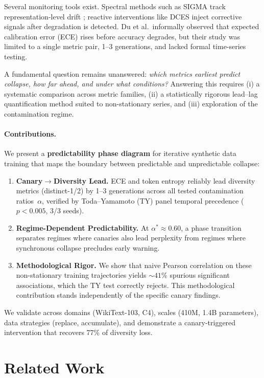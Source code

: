 \documentclass[letterpaper,11pt]{article}
\begin{document}
Several monitoring tools exist. Spectral methods such as SIGMA track representation-level drift \cite{dohmatob2024model}; reactive interventions like DCES inject corrective signals after degradation is detected. Du et al.\ informally observed that expected calibration error (ECE) rises before accuracy degrades, but their study was limited to a single metric pair, 1--3 generations, and lacked formal time-series testing.

A fundamental question remains unanswered: \emph{which metrics earliest predict collapse, how far ahead, and under what conditions?}
Answering this requires (i) a systematic comparison across metric families, (ii) a statistically rigorous lead--lag quantification method suited to non-stationary series, and (iii) exploration of the contamination regime.

\paragraph{Contributions.}
We present a \textbf{predictability phase diagram} for iterative synthetic data training that maps the boundary between predictable and unpredictable collapse:
\begin{enumerate}
    \item \textbf{Canary$\to$Diversity Lead.} ECE and token entropy reliably lead diversity metrics (distinct-1/2) by 1--3 generations across all tested contamination ratios~$\alpha$, verified by Toda--Yamamoto (TY) panel temporal precedence ($p<0.005$, 3/3 seeds).
    \item \textbf{Regime-Dependent Predictability.} At $\alpha^*\!\approx\!0.60$, a phase transition separates regimes where canaries also lead perplexity from regimes where synchronous collapse precludes early warning.
    \item \textbf{Methodological Rigor.} We show that naive Pearson correlation on these non-stationary training trajectories yields ${\sim}41\%$ spurious significant associations, which the TY test correctly rejects. This methodological contribution stands independently of the specific canary findings.
\end{enumerate}

We validate across domains (WikiText-103, C4), scales (410M, 1.4B parameters), data strategies (replace, accumulate), and demonstrate a canary-triggered intervention that recovers 77\% of diversity loss.

\section{Related Work}
\end{document}
